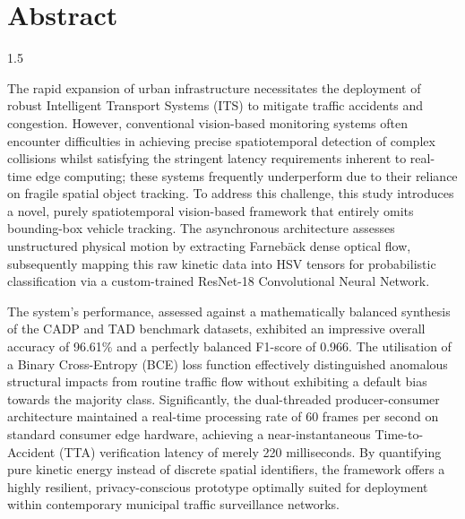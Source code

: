 \newpage

\chapter*{\centering Abstract}
\vspace{-0.2in}

\begin{spacing}{1.5}
\setlength{\parskip}{0.3in}
\setlength{\parindent}{0in}


The rapid expansion of urban infrastructure necessitates the deployment of robust Intelligent Transport Systems (ITS) to mitigate traffic accidents and congestion. However, conventional vision-based monitoring systems often encounter difficulties in achieving precise spatiotemporal detection of complex collisions whilst satisfying the stringent latency requirements inherent to real-time edge computing; these systems frequently underperform due to their reliance on fragile spatial object tracking. To address this challenge, this study introduces a novel, purely spatiotemporal vision-based framework that entirely omits bounding-box vehicle tracking. The asynchronous architecture assesses unstructured physical motion by extracting Farnebäck dense optical flow, subsequently mapping this raw kinetic data into HSV tensors for probabilistic classification via a custom-trained ResNet-18 Convolutional Neural Network.

The system's performance, assessed against a mathematically balanced synthesis of the CADP and TAD benchmark datasets, exhibited an impressive overall accuracy of 96.61\% and a perfectly balanced F1-score of 0.966. The utilisation of a Binary Cross-Entropy (BCE) loss function effectively distinguished anomalous structural impacts from routine traffic flow without exhibiting a default bias towards the majority class. Significantly, the dual-threaded producer-consumer architecture maintained a real-time processing rate of 60 frames per second on standard consumer edge hardware, achieving a near-instantaneous Time-to-Accident (TTA) verification latency of merely 220 milliseconds. By quantifying pure kinetic energy instead of discrete spatial identifiers, the framework offers a highly resilient, privacy-conscious prototype optimally suited for deployment within contemporary municipal traffic surveillance networks.

\par
\end{spacing}
\newpage
